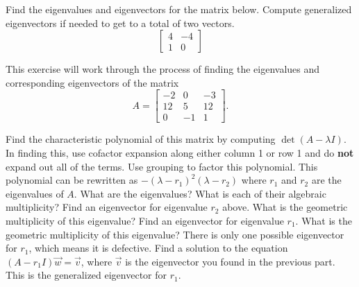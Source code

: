 \begin{exercise}\ansMark%
Find the eigenvalues and eigenvectors for the matrix below. Compute generalized eigenvectors if needed to get to a total of two vectors. 
\[ \begin{bmatrix} 4 & -4 \\ 1 & 0 \end{bmatrix} \]
\end{exercise}

\begin{exercise}
This exercise will work through the process of finding the eigenvalues and corresponding eigenvectors of the matrix
\begin{equation*}
A = \begin{bmatrix}
-2 & 0 & -3 \\ 12 & 5  & 12 \\ 0 &-1 & 1
\end{bmatrix}.
\end{equation*}
\begin{tasks}
\task Find the characteristic polynomial of this matrix by computing $\det(A - \lambda I)$. In finding this, use cofactor expansion along either column 1 or row 1 and do \textbf{not} expand out all of the terms. Use grouping to factor this polynomial.
\task This polynomial can be rewritten as $-(\lambda - r_1)^2(\lambda - r_2)$ where $r_1$ and $r_2$ are the eigenvalues of $A$. What are the eigenvalues? What is each of their algebraic multiplicity?
\task Find an eigenvector for eigenvalue $r_2$ above. What is the geometric multiplicity of this eigenvalue?
\task Find an eigenvector for eigenvalue $r_1$. What is the geometric multiplicity of this eigenvalue?
\task There is only one possible eigenvector for $r_1$, which means it is defective. Find a solution to the equation $(A - r_1 I) \vec{w} = \vec{v}$, where $\vec{v}$ is the eigenvector you found in the previous part. This is the generalized eigenvector for $r_1$. 
\end{tasks}
\end{exercise}

